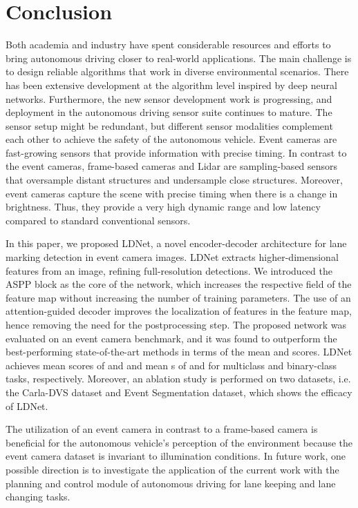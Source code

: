 \documentclass[journal]{IEEEtran}
\begin{document}
\section{Conclusion}
Both academia and industry have spent considerable resources and efforts to bring autonomous driving closer to real-world applications. The main challenge is to design reliable algorithms that work in diverse environmental scenarios. There has been extensive development at the algorithm level inspired by deep neural networks. Furthermore, the new sensor development work is progressing, and deployment in the autonomous driving sensor suite continues to mature. The sensor setup might be redundant, but different sensor modalities complement each other to achieve the safety of the autonomous vehicle. Event cameras are fast-growing sensors that provide information with precise timing. In contrast to the event cameras, frame-based cameras and Lidar are sampling-based sensors that oversample distant structures and undersample close structures. Moreover, event cameras capture the scene with precise timing when there is a change in brightness. Thus, they provide a very high dynamic range and low latency compared to standard conventional sensors. 
\par
In this paper, we proposed LDNet, a novel encoder-decoder architecture for lane marking detection in event camera images. LDNet extracts higher-dimensional features from an image, refining full-resolution detections. We introduced the ASPP block as the core of the network, which increases the respective field of the feature map without increasing the number of training parameters. The use of an attention-guided decoder improves the localization of features in the feature map, hence removing the need for the postprocessing step. The proposed network was evaluated on an event camera benchmark, and it was found to outperform the best-performing state-of-the-art methods in terms of the mean  and  scores. LDNet achieves mean  scores of  and  and mean s of  and  for multiclass and binary-class tasks, respectively. Moreover, an ablation study is performed on two datasets, i.e. the Carla-DVS dataset and Event Segmentation dataset, which shows the efficacy of LDNet.
\par
The utilization of an event camera in contrast to a frame-based camera is beneficial for the autonomous vehicle's perception of the environment because the event camera dataset is invariant to illumination conditions. In future work, one possible direction is to investigate the application of the current work with the planning and control module of autonomous driving \cite{swn}\cite{sa} for lane keeping and lane changing tasks.
\end{document}
